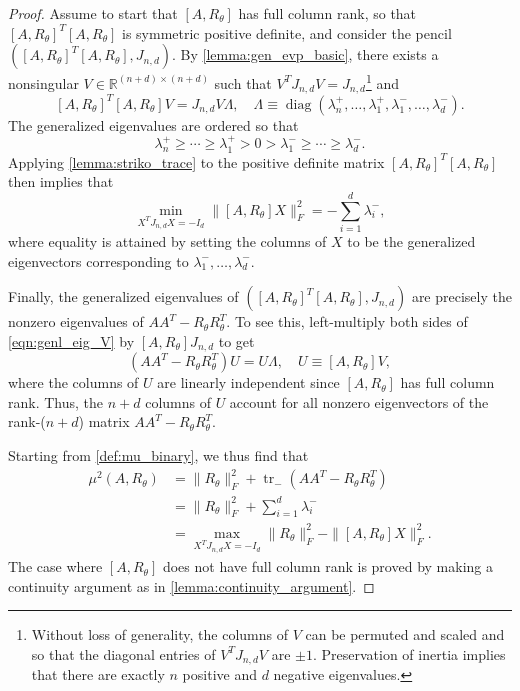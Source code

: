\documentclass{article}
\newcommand{\tr}{\operatorname{tr}}
\newcommand{\ts}{^T}
\DeclareMathOperator{\Diag}{diag}
\begin{document}
\begin{proof}
    Assume to start that $[A,R_\theta]$ has full column rank, so that $[A,R_\theta]\ts[A,R_\theta]$ is symmetric positive definite, and consider the pencil $([A,R_\theta]\ts[A,R_\theta], J_{n,d})$. By \cref{lemma:gen_evp_basic}, there exists a nonsingular $V\in \mathbb{R}^{(n+d)\times (n+d)}$ such that $V\ts J_{n,d}V = J_{n,d}$\footnote{Without loss of generality, the columns of $V$ can be permuted and scaled and so that the diagonal entries of $V\ts J_{n,d}V$ are $\pm 1$. Preservation of inertia implies that there are exactly $n$ positive and $d$ negative eigenvalues.} and 
    \begin{equation}\label{eqn:genl_eig_V}
        [A,R_\theta]\ts [A,R_\theta]V = J_{n,d}V\Lambda, \quad \Lambda \equiv \Diag(\lambda_{n}^+,\ldots,\lambda_1^+,\lambda_1^-,\ldots,\lambda_{d}^-).
    \end{equation}
    The generalized eigenvalues are ordered so that
    \[\lambda_n^+\geq \cdots \geq \lambda_1^+ > 0 > \lambda_1^- \geq \cdots \geq \lambda_d^-.\]
    Applying \cref{lemma:striko_trace} to the positive definite matrix $[A,R_\theta]\ts[A,R_\theta]$ then implies that
    \begin{equation}\label{eqn:negative_genl_eigvals}
        \min_{X\ts J_{n,d}X = -I_d} \|[A,R_\theta]X\|_F^2 = -\sum_{i=1}^d\lambda_i^{-},
    \end{equation}
    where equality is attained by setting the columns of $X$ to be the generalized eigenvectors corresponding to $\lambda_{1}^-,\ldots,\lambda_d^-$. 
    
    Finally, the generalized eigenvalues of $([A,R_\theta]\ts[A,R_\theta], J_{n,d})$ are precisely the nonzero eigenvalues of $AA\ts-R_\theta R_\theta\ts$. To see this, left-multiply both sides of \cref{eqn:genl_eig_V} by $[A,R_\theta]J_{n,d}$ to get
    \begin{equation}\label{eqn:U_relation_AV}
        (AA\ts-R_\theta R_\theta \ts)U = U\Lambda,\quad U \equiv [A,R_\theta]V,
    \end{equation}
    where the columns of $U$ are linearly independent since $[A,R_\theta]$ has full column rank. Thus, the $n+d$ columns of $U$ account for all nonzero eigenvectors of the rank-($n+d$) matrix $AA\ts - R_\theta R_\theta\ts$.    
    
    Starting from \cref{def:mu_binary}, we thus find that
    \begin{align*}
        \mu^2(A,R_\theta) &= \|R_\theta\|_F^2 + \tr_-\left(AA\ts - R_\theta R_\theta\ts\right) \\
        &= \|R_\theta\|_F^2 + \sum_{i=1}^d\lambda_i^{-} \\
        &= \max_{X\ts J_{n,d}X = -I_d} \|R_\theta\|_F^2 - \|[A, R_\theta]X\|_F^2.
    \end{align*}
    The case where $[A,R_\theta]$ does not have full column rank is proved by making a continuity argument as in \cref{lemma:continuity_argument}.
\end{proof}
\end{document}
